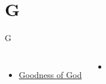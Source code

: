 \documentclass{beamer}
\begin{document}
\section{G}

\begin{frame}{G}
\begin{columns}
        \begin{itemize}
    \item \hyperlink{Goodness of God['All my life You have been faithful']}{Goodness of God } \phantom{ 1 1 1 1 1 1 1 1 1 1}
\end{itemize}
        \begin{itemize}
            \item[] \phantom{1}\end{itemize}


\end{columns}

\end{frame}
\end{document}
